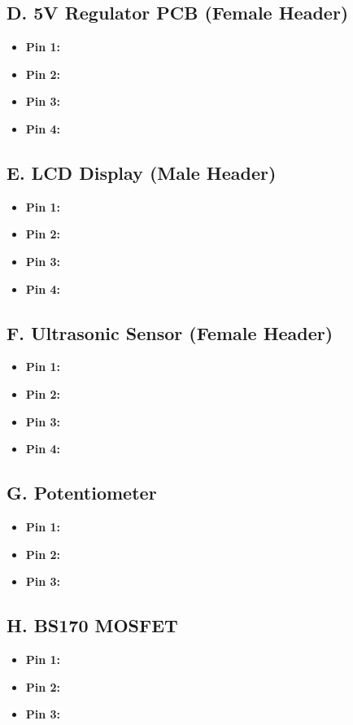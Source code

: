 \documentclass[12pt, letterpaper]{article}
\begin{document}
\subsection*{D. 5V Regulator PCB (Female Header)}
\begin{itemize}
	\item \textbf{Pin 1:}
	\item \textbf{Pin 2:}
	\item \textbf{Pin 3:}
	\item \textbf{Pin 4:}
\end{itemize}

\subsection*{E. LCD Display (Male Header)}
\begin{itemize}
	\item \textbf{Pin 1:}
	\item \textbf{Pin 2:}
	\item \textbf{Pin 3:}
	\item \textbf{Pin 4:}
\end{itemize}

\subsection*{F. Ultrasonic Sensor (Female Header)}
\begin{itemize}
	\item \textbf{Pin 1:}
	\item \textbf{Pin 2:}
	\item \textbf{Pin 3:}
	\item \textbf{Pin 4:}
\end{itemize}

\subsection*{G. Potentiometer}
\begin{itemize}
	\item \textbf{Pin 1:}
	\item \textbf{Pin 2:}
	\item \textbf{Pin 3:}
\end{itemize}

\subsection*{H. BS170 MOSFET}
\begin{itemize}
	\item \textbf{Pin 1:}
	\item \textbf{Pin 2:}
	\item \textbf{Pin 3:}
\end{itemize}
\end{document}
